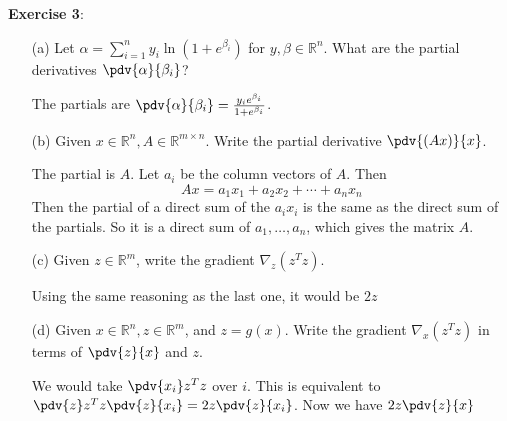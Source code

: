\documentclass{article}
\begin{document}
\textbf{Exercise 3}: \begin{itemize}
    \item [(a)] Let $\alpha = \sum_{i = 1}^{n} y_{i} \ln(1 + e^{\beta_{i}})$ for $y, \beta \in \mathbb{R}^{n}$. What are the partial derivatives $\pdv{\alpha}{\beta_{i}}$?
        \begin{answer}
            The partials are $\pdv{\alpha}{\beta_{i}} = \frac{y_{i}e^{\beta_{i}}}{1 + e^{\beta_{i}}}$.
        \end{answer}

    \item [(b)] Given $x \in \mathbb{R}^{n}, A \in \mathbb{R}^{m \times n}$. Write the partial derivative $\pdv{(Ax)}{x}$.
        \begin{answer}
            The partial is $A$. Let $a_{i}$ be the column vectors of $A$. Then 
                \begin{equation*}
                    Ax = a_{1}x_{1} + a_{2}x_{2} + \cdots + a_{n}x_{n}
                \end{equation*}
            Then the partial of a direct sum of the $a_{i}x_{i}$ is the same as the direct sum of the partials. So it is a direct sum of $a_{1}, \ldots, a_{n}$, which gives the matrix $A$.
        \end{answer}

    \item [(c)] Given $z \in \mathbb{R}^{m}$, write the gradient $\nabla_{z}(z^{T}z)$.
        \begin{answer}
            Using the same reasoning as the last one, it would be $2z$
        \end{answer}

    \item [(d)] Given $x \in \mathbb{R}^{n}, z \in \mathbb{R}^{m}$, and $z = g(x)$. Write the gradient $\nabla_{x}(z^{T}z)$ in terms of $\pdv{z}{x}$ and $z$.
        \begin{answer}
            We would take $\pdv{x_{i}}z^{T}z$ over $i$. This is equivalent to $\pdv{z}z^{T}z\pdv{z}{x_{i}} = 2z\pdv{z}{x_{i}}$. Now we have $2z\pdv{z}{x}$
        \end{answer}


\end{itemize}
\end{document}
